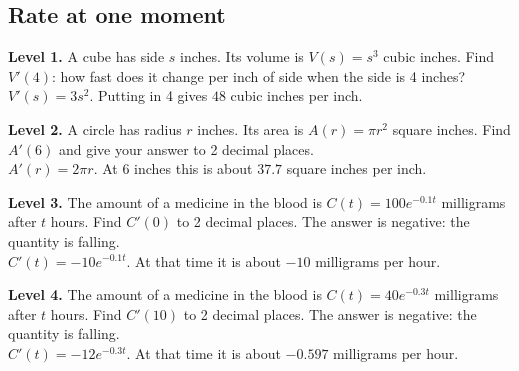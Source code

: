 \documentclass[11pt]{article}
\begin{document}
\subsection*{Rate at one moment}
\noindent\textbf{Level 1.} A cube has side $s$ inches. Its volume is $V(s)=s^3$ cubic inches. Find $V'(4)$: how fast does it change per inch of side when the side is 4 inches?\\  \quad $V'(s)=3s^2$. Putting in 4 gives $48$ cubic inches per inch.\par\medskip
\noindent\textbf{Level 2.} A circle has radius $r$ inches. Its area is $A(r)=\pi r^2$ square inches. Find $A'(6)$ and give your answer to 2 decimal places.\\  \quad $A'(r)=2\pi r$. At 6 inches this is about $37.7$ square inches per inch.\par\medskip
\noindent\textbf{Level 3.} The amount of a medicine in the blood is $C(t)=100e^{-0.1t}$ milligrams after $t$ hours. Find $C'(0)$ to 2 decimal places. The answer is negative: the quantity is falling.\\  \quad $C'(t)=-10e^{-0.1t}$. At that time it is about $-10$ milligrams per hour.\par\medskip
\noindent\textbf{Level 4.} The amount of a medicine in the blood is $C(t)=40e^{-0.3t}$ milligrams after $t$ hours. Find $C'(10)$ to 2 decimal places. The answer is negative: the quantity is falling.\\  \quad $C'(t)=-12e^{-0.3t}$. At that time it is about $-0.597$ milligrams per hour.\par\medskip
\end{document}
